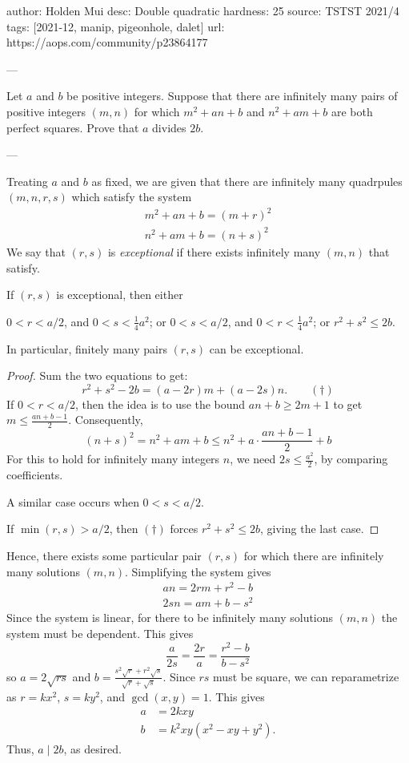 author: Holden Mui
desc: Double quadratic
hardness: 25
source: TSTST 2021/4
tags: [2021-12, manip, pigeonhole, dalet]
url: https://aops.com/community/p23864177

---

Let $a$ and $b$ be positive integers.
Suppose that there are infinitely many pairs of positive integers $(m, n)$
for which $m^2+an+b$ and $n^2+am+b$ are both perfect squares.
Prove that $a$ divides $2b$.

---

Treating $a$ and $b$ as fixed,
we are given that there are infinitely many quadrpules $(m,n,r,s)$
which satisfy the system
\begin{gather*}
  m^2+an+b=(m+r)^2 \\
  n^2+am+b=(n+s)^2
\end{gather*}
We say that $(r,s)$ is \emph{exceptional}
if there exists infinitely many $(m,n)$ that satisfy.

\begin{claim*}
  If $(r,s)$ is exceptional, then either
  \begin{itemize}
    \ii $0 < r < a/2$, and $0 < s < \frac14 a^2$; or
    \ii $0 < s < a/2$, and $0 < r < \frac14 a^2$; or
    \ii $r^2 + s^2 \le 2b$.
  \end{itemize}
  In particular, finitely many pairs $(r,s)$ can be exceptional.
\end{claim*}

\begin{proof}
  Sum the two equations to get:
  \[ r^2+s^2-2b = (a-2r)m + (a-2s)n. \qquad (\dagger) \]
  If $0 < r < a/2$, then the idea is to use the bound
  $an+b \ge 2m+1$ to get $m \le \frac{an+b-1}{2}$.
  Consequently,
  \[ (n+s)^2 = n^2+am+b \le n^2 + a \cdot \frac{an+b-1}{2} + b \]
  For this to hold for infinitely many integers $n$,
  we need $2s \le \frac{a^2}{2}$, by comparing coefficients.

  A similar case occurs when $0 < s < a/2$.

  If $\min(r,s) > a/2$, then $(\dagger)$ forces $r^2+s^2 \le 2b$,
  giving the last case.
\end{proof}

Hence, there exists some particular pair $(r,s)$
for which there are infinitely many solutions
$(m,n)$. Simplifying the system gives
\begin{gather*}
  an = 2rm + r^2-b \\
  2sn = am + b-s^2
\end{gather*}
Since the system is linear,
for there to be infinitely many solutions $(m, n)$
the system must be dependent.
This gives \[\frac{a}{2s}=\frac{2r}{a}=\frac{r^2-b}{b-s^2}\]
so $a = 2\sqrt{rs}$ and $b = \frac{s^2\sqrt{r}+r^2\sqrt{s}}{\sqrt{r}+\sqrt{s}}$.
Since $rs$ must be square, we can reparametrize as $r=kx^2$, $s=ky^2$, and $\gcd(x, y)=1$.
This gives
\begin{align*}
    a &= 2kxy \\
    b &= k^2xy(x^2-xy+y^2).
\end{align*}
Thus, $a \mid 2b$, as desired.
